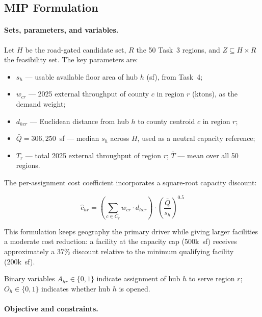 \subsection{MIP Formulation}

\paragraph{Sets, parameters, and variables.}

Let $H$ be the road-gated candidate set, $R$ the 50 Task~3 regions, and
$Z \subseteq H \times R$ the feasibility set. The key parameters are:

\begin{itemize}
  \item $s_h$ — usable available floor area of hub $h$ (sf), from Task~4;
  \item $w_{cr}$ — 2025 external throughput of county $c$ in region $r$ (ktons),
        as the demand weight;
  \item $d_{hcr}$ — Euclidean distance from hub $h$ to county centroid $c$ in region $r$;
  \item $\bar{Q} = 306{,}250$~sf — median $s_h$ across $H$, used as a neutral capacity
        reference;
  \item $T_r$ — total 2025 external throughput of region $r$; $\bar{T}$ — mean over all
        50 regions.
\end{itemize}

The per-assignment cost coefficient incorporates a square-root capacity discount:

\begin{equation}
  \hat{c}_{hr} = \left(\sum_{c \in C_r} w_{cr} \cdot d_{hcr}\right)
    \cdot \left(\frac{\bar{Q}}{s_h}\right)^{0.5}
  \label{eq:task5-cost}
\end{equation}

This formulation keeps geography the primary driver while giving larger facilities a
moderate cost reduction: a facility at the capacity cap (500k~sf) receives approximately
a 37\% discount relative to the minimum qualifying facility (200k~sf).

Binary variables $A_{hr} \in \{0,1\}$ indicate assignment of hub $h$ to serve region
$r$; $O_h \in \{0,1\}$ indicates whether hub $h$ is opened.

\paragraph{Objective and constraints.}

